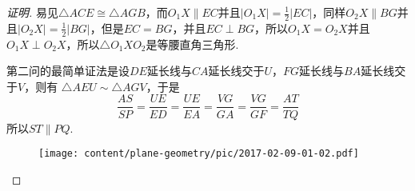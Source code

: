 \begin{proof}[证明]
  易见$\triangle ACE \cong \triangle AGB$，而$O_{1}X \parallel EC$并且$|O_{1}X|=\frac{1}{2}|EC|$，同样$O_2X \parallel BG$并且$|O_2X|=\frac{1}{2}|BG|$，但是$EC=BG$，并且$EC \perp BG$，所以$O_1X=O_2X$并且$O_1X \perp O_2X$，所以$\triangle O_{1}XO_{2}$是等腰直角三角形.

  第二问的最简单证法是设$DE$延长线与$CA$延长线交于$U$，$FG$延长线与$BA$延长线交于$V$，则有 $\triangle AEU \sim \triangle AGV$，于是
  \begin{equation*}
    \frac{AS}{SP}=\frac{UE}{ED}=\frac{UE}{EA}=\frac{VG}{GA}=\frac{VG}{GF}=\frac{AT}{TQ}
  \end{equation*}
  所以$ST \parallel PQ$.

\begin{figure}[htbp]
  \centering
\texttt{[image: content/plane-geometry/pic/2017-02-09-01-02.pdf]}
\caption{}
\label{fig:2017-02-09-01-02}
\end{figure}


\end{proof}

